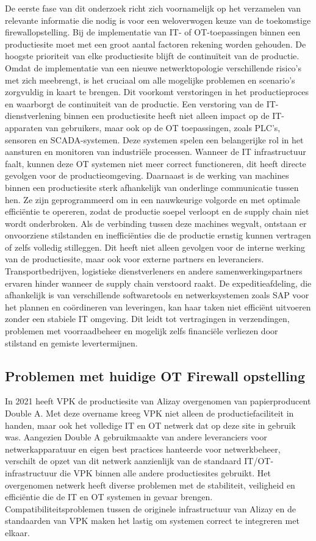 De eerste fase van dit onderzoek richt zich voornamelijk op het verzamelen van relevante informatie die nodig is voor een weloverwogen keuze van de toekomstige firewallopstelling. Bij de implementatie van IT- of OT-toepassingen binnen een productiesite moet met een groot aantal factoren rekening worden gehouden. De hoogste prioriteit van elke productiesite blijft de continuïteit van de productie. Omdat de implementatie van een nieuwe netwerktopologie verschillende risico’s met zich meebrengt, is het cruciaal om alle mogelijke problemen en scenario’s zorgvuldig in kaart te brengen. Dit voorkomt verstoringen in het productieproces en waarborgt de continuiteit van de productie.
Een verstoring van de IT-dienstverlening binnen een productiesite heeft niet alleen impact op de IT-apparaten van gebruikers, maar ook op de OT toepassingen, zoals PLC’s, sensoren en SCADA-systemen. Deze systemen spelen een belangerijke rol in het aansturen en monitoren van industriële processen. Wanneer de IT infrastructuur faalt, kunnen deze OT systemen niet meer correct functioneren, dit heeft directe gevolgen voor de productieomgeving. Daarnaast is de werking van machines binnen een productiesite sterk afhankelijk van onderlinge communicatie tussen hen. Ze zijn geprogrammeerd om in een nauwkeurige volgorde en met optimale efficiëntie te opereren, zodat de productie soepel verloopt en de supply chain niet wordt onderbroken. Als de verbinding tussen deze machines wegvalt, ontstaan er onvoorziene stilstanden en inefficiënties die de productie ernstig kunnen vertragen of zelfs volledig stilleggen. Dit heeft niet alleen gevolgen voor de interne werking van de productiesite, maar ook voor externe partners en leveranciers. Transportbedrijven, logistieke dienstverleners en andere samenwerkingspartners ervaren hinder wanneer de supply chain verstoord raakt. De expeditieafdeling, die afhankelijk is van verschillende softwaretools en netwerksystemen zoals SAP voor het plannen en coördineren van leveringen, kan haar taken niet efficiënt uitvoeren zonder een stabiele IT omgeving. Dit leidt tot vertragingen in verzendingen, problemen met voorraadbeheer en mogelijk zelfs financiële verliezen door stilstand en gemiste levertermijnen.


\subsection{Problemen met huidige OT Firewall opstelling}
In 2021 heeft VPK de productiesite van Alizay overgenomen van papierproducent Double A. Met deze overname kreeg VPK niet alleen de productiefaciliteit in handen, maar ook het volledige IT en OT netwerk dat op deze site in gebruik was. Aangezien Double A gebruikmaakte van andere leveranciers voor netwerkapparatuur en eigen best practices hanteerde voor netwerkbeheer, verschilt de opzet van dit netwerk aanzienlijk van de standaard IT/OT-infrastructuur die VPK binnen alle andere productiesites gebruikt.
Het overgenomen netwerk heeft diverse problemen met de stabiliteit, veiligheid en efficiëntie die de IT en OT systemen in gevaar brengen. Compatibiliteitsproblemen tussen de originele infrastructuur van Alizay en de standaarden van VPK maken het lastig om systemen correct te integreren met elkaar.
 
